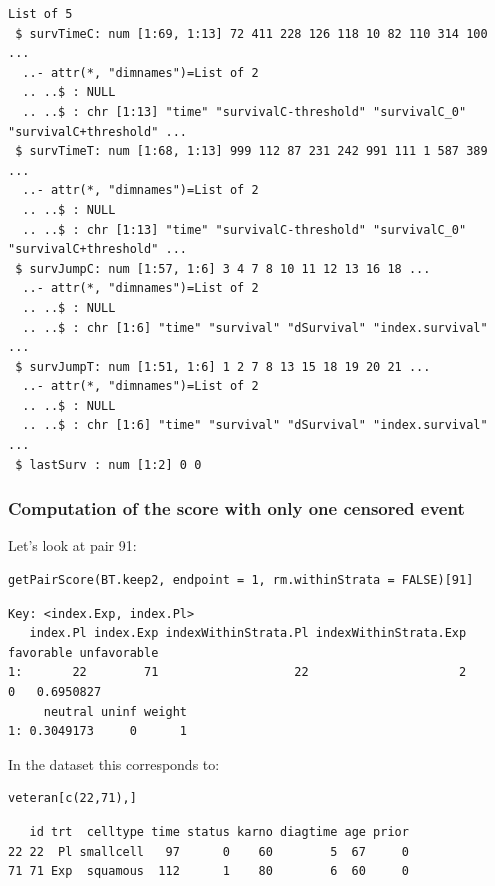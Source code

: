 \documentclass[12pt]{article}
\begin{document}
\begin{verbatim}
List of 5
 $ survTimeC: num [1:69, 1:13] 72 411 228 126 118 10 82 110 314 100 ...
  ..- attr(*, "dimnames")=List of 2
  .. ..$ : NULL
  .. ..$ : chr [1:13] "time" "survivalC-threshold" "survivalC_0" "survivalC+threshold" ...
 $ survTimeT: num [1:68, 1:13] 999 112 87 231 242 991 111 1 587 389 ...
  ..- attr(*, "dimnames")=List of 2
  .. ..$ : NULL
  .. ..$ : chr [1:13] "time" "survivalC-threshold" "survivalC_0" "survivalC+threshold" ...
 $ survJumpC: num [1:57, 1:6] 3 4 7 8 10 11 12 13 16 18 ...
  ..- attr(*, "dimnames")=List of 2
  .. ..$ : NULL
  .. ..$ : chr [1:6] "time" "survival" "dSurvival" "index.survival" ...
 $ survJumpT: num [1:51, 1:6] 1 2 7 8 13 15 18 19 20 21 ...
  ..- attr(*, "dimnames")=List of 2
  .. ..$ : NULL
  .. ..$ : chr [1:6] "time" "survival" "dSurvival" "index.survival" ...
 $ lastSurv : num [1:2] 0 0
\end{verbatim}

\subsubsection{Computation of the score with only one censored event}
\label{sec:orga4b3f39}

Let's look at pair 91:
\lstset{language=r,label= ,caption= ,captionpos=b,numbers=none}
\begin{lstlisting}
getPairScore(BT.keep2, endpoint = 1, rm.withinStrata = FALSE)[91]
\end{lstlisting}

\begin{verbatim}
Key: <index.Exp, index.Pl>
   index.Pl index.Exp indexWithinStrata.Pl indexWithinStrata.Exp favorable unfavorable
1:       22        71                   22                     2         0   0.6950827
     neutral uninf weight
1: 0.3049173     0      1
\end{verbatim}


In the dataset this corresponds to:
\lstset{language=r,label= ,caption= ,captionpos=b,numbers=none}
\begin{lstlisting}
veteran[c(22,71),]
\end{lstlisting}

\begin{verbatim}
   id trt  celltype time status karno diagtime age prior
22 22  Pl smallcell   97      0    60        5  67     0
71 71 Exp  squamous  112      1    80        6  60     0
\end{verbatim}
\end{document}
